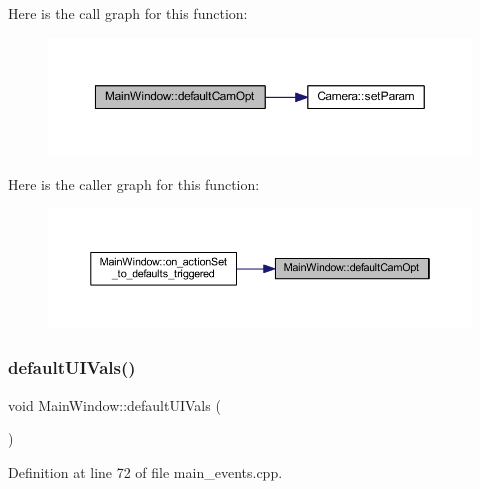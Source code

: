 Here is the call graph for this function\+:
\nopagebreak
\begin{figure}[H]
\begin{center}
\leavevmode
\includegraphics[width=350pt]{classMainWindow_ad6c3df0bfe7f2357d3f2083e20e3810a_cgraph}
\end{center}
\end{figure}
Here is the caller graph for this function\+:
\nopagebreak
\begin{figure}[H]
\begin{center}
\leavevmode
\includegraphics[width=350pt]{classMainWindow_ad6c3df0bfe7f2357d3f2083e20e3810a_icgraph}
\end{center}
\end{figure}
\mbox{\label{classMainWindow_a6021f4624cf5aa8ced6b210d388ac31d}} 
\subsubsection{\texorpdfstring{defaultUIVals()}{defaultUIVals()}}
{\footnotesize\ttfamily void Main\+Window\+::default\+U\+I\+Vals (\begin{DoxyParamCaption}{ }\end{DoxyParamCaption})\hspace{0.3cm}{\ttfamily [private]}}



Definition at line 72 of file main\+\_\+events.\+cpp.

